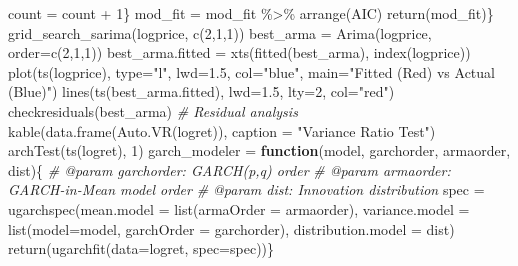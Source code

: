 \documentclass[
  11pt,
]{article}
\newenvironment{Shaded}{\begin{snugshade}}{\end{snugshade}}
\newcommand{\AttributeTok}[1]{\textcolor[rgb]{0.77,0.63,0.00}{#1}}
\newcommand{\CommentTok}[1]{\textcolor[rgb]{0.56,0.35,0.01}{\textit{#1}}}
\newcommand{\ControlFlowTok}[1]{\textcolor[rgb]{0.13,0.29,0.53}{\textbf{#1}}}
\newcommand{\DecValTok}[1]{\textcolor[rgb]{0.00,0.00,0.81}{#1}}
\newcommand{\FloatTok}[1]{\textcolor[rgb]{0.00,0.00,0.81}{#1}}
\newcommand{\FunctionTok}[1]{\textcolor[rgb]{0.00,0.00,0.00}{#1}}
\newcommand{\NormalTok}[1]{#1}
\newcommand{\OtherTok}[1]{\textcolor[rgb]{0.56,0.35,0.01}{#1}}
\newcommand{\SpecialCharTok}[1]{\textcolor[rgb]{0.00,0.00,0.00}{#1}}
\newcommand{\StringTok}[1]{\textcolor[rgb]{0.31,0.60,0.02}{#1}}
\begin{document}
\begin{Shaded}
\begin{Highlighting}[]
\NormalTok{    count }\OtherTok{=}\NormalTok{ count }\SpecialCharTok{+} \DecValTok{1}\NormalTok{\}}
\NormalTok{  mod\_fit }\OtherTok{=}\NormalTok{ mod\_fit }\SpecialCharTok{\%\textgreater{}\%} \FunctionTok{arrange}\NormalTok{(AIC)}
  \FunctionTok{return}\NormalTok{(mod\_fit)\}}
\FunctionTok{grid\_search\_sarima}\NormalTok{(logprice, }\FunctionTok{c}\NormalTok{(}\DecValTok{2}\NormalTok{,}\DecValTok{1}\NormalTok{,}\DecValTok{1}\NormalTok{))}
\NormalTok{best\_arma }\OtherTok{=} \FunctionTok{Arima}\NormalTok{(logprice, }\AttributeTok{order=}\FunctionTok{c}\NormalTok{(}\DecValTok{2}\NormalTok{,}\DecValTok{1}\NormalTok{,}\DecValTok{1}\NormalTok{))}
\NormalTok{best\_arma.fitted }\OtherTok{=} \FunctionTok{xts}\NormalTok{(}\FunctionTok{fitted}\NormalTok{(best\_arma), }\FunctionTok{index}\NormalTok{(logprice))}
\FunctionTok{plot}\NormalTok{(}\FunctionTok{ts}\NormalTok{(logprice), }\AttributeTok{type=}\StringTok{"l"}\NormalTok{, }\AttributeTok{lwd=}\FloatTok{1.5}\NormalTok{, }\AttributeTok{col=}\StringTok{"blue"}\NormalTok{, }\AttributeTok{main=}\StringTok{"Fitted (Red) vs Actual (Blue)"}\NormalTok{)}
\FunctionTok{lines}\NormalTok{(}\FunctionTok{ts}\NormalTok{(best\_arma.fitted), }\AttributeTok{lwd=}\FloatTok{1.5}\NormalTok{, }\AttributeTok{lty=}\DecValTok{2}\NormalTok{, }\AttributeTok{col=}\StringTok{"red"}\NormalTok{)}
\FunctionTok{checkresiduals}\NormalTok{(best\_arma) }\CommentTok{\# Residual analysis}
\FunctionTok{kable}\NormalTok{(}\FunctionTok{data.frame}\NormalTok{(}\FunctionTok{Auto.VR}\NormalTok{(logret)), }\AttributeTok{caption =} \StringTok{"Variance Ratio Test"}\NormalTok{)}
\FunctionTok{archTest}\NormalTok{(}\FunctionTok{ts}\NormalTok{(logret), }\DecValTok{1}\NormalTok{)}
\NormalTok{garch\_modeler }\OtherTok{=} \ControlFlowTok{function}\NormalTok{(model, garchorder, armaorder, dist)\{}
  \CommentTok{\#\textquotesingle{} @param garchorder: GARCH(p,q) order}
  \CommentTok{\#\textquotesingle{} @param armaorder: GARCH{-}in{-}Mean model order}
  \CommentTok{\#\textquotesingle{} @param dist: Innovation distribution}
\NormalTok{  spec }\OtherTok{=} \FunctionTok{ugarchspec}\NormalTok{(}\AttributeTok{mean.model =} \FunctionTok{list}\NormalTok{(}\AttributeTok{armaOrder =}\NormalTok{ armaorder),}
                    \AttributeTok{variance.model =} \FunctionTok{list}\NormalTok{(}\AttributeTok{model=}\NormalTok{model, }\AttributeTok{garchOrder =}\NormalTok{ garchorder), }
                    \AttributeTok{distribution.model =}\NormalTok{ dist) }
  \FunctionTok{return}\NormalTok{(}\FunctionTok{ugarchfit}\NormalTok{(}\AttributeTok{data=}\NormalTok{logret, }\AttributeTok{spec=}\NormalTok{spec))\}}

\end{Highlighting}
\end{Shaded}
\end{document}
